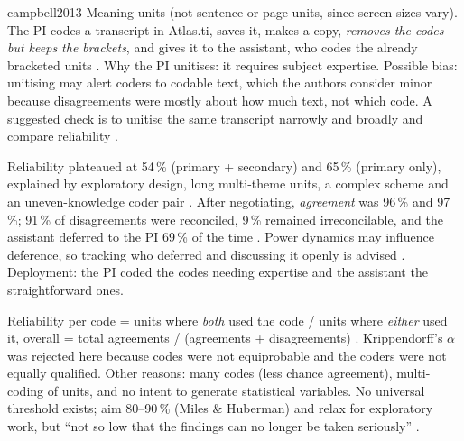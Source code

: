\begin{papercard}{campbell2013}
 Meaning units (not sentence or page units, since screen sizes vary). The PI codes a transcript in Atlas.ti, saves it, makes a copy, \emph{removes the codes but keeps the brackets}, and gives it to the assistant, who codes the already bracketed units . Why the PI unitises: it requires subject expertise. Possible bias: unitising may alert coders to codable text, which the authors consider minor because disagreements were mostly about how much text, not which code. A suggested check is to unitise the same transcript narrowly and broadly and compare reliability .

 Reliability plateaued at 54\,\% (primary + secondary) and 65\,\% (primary only), explained by exploratory design, long multi-theme units, a complex scheme and an uneven-knowledge coder pair . After negotiating, \emph{agreement} was 96\,\% and 97\,\%; 91\,\% of disagreements were reconciled, 9\,\% remained irreconcilable, and the assistant deferred to the PI 69\,\% of the time . Power dynamics may influence deference, so tracking who deferred and discussing it openly is advised . Deployment: the PI coded the codes needing expertise and the assistant the straightforward ones.

 Reliability per code = units where \emph{both} used the code / units where \emph{either} used it, overall = total agreements / (agreements + disagreements) . Krippendorff's $\alpha$ was rejected here because codes were not equiprobable and the coders were not equally qualified. Other reasons: many codes (less chance agreement), multi-coding of units, and no intent to generate statistical variables. No universal threshold exists; aim 80--90\,\% (Miles \& Huberman) and relax for exploratory work, but ``not so low that the findings can no longer be taken seriously'' .


\end{papercard}
